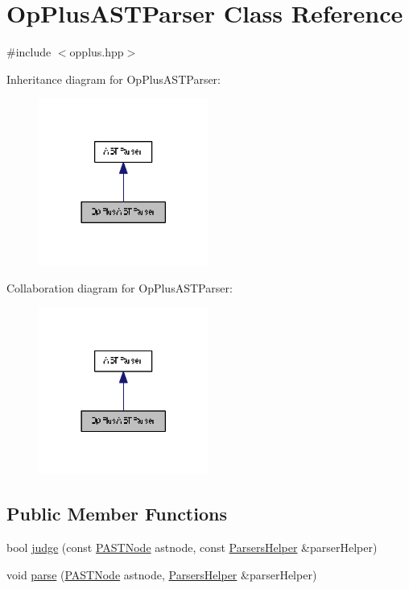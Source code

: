 \hypertarget{class_op_plus_a_s_t_parser}{}\section{Op\+Plus\+A\+S\+T\+Parser Class Reference}
\label{class_op_plus_a_s_t_parser}


{\ttfamily \#include $<$opplus.\+hpp$>$}



Inheritance diagram for Op\+Plus\+A\+S\+T\+Parser\+:
\nopagebreak
\begin{figure}[H]
\begin{center}
\leavevmode
\includegraphics[width=158pt]{class_op_plus_a_s_t_parser__inherit__graph}
\end{center}
\end{figure}


Collaboration diagram for Op\+Plus\+A\+S\+T\+Parser\+:
\nopagebreak
\begin{figure}[H]
\begin{center}
\leavevmode
\includegraphics[width=158pt]{class_op_plus_a_s_t_parser__coll__graph}
\end{center}
\end{figure}
\subsection*{Public Member Functions}
\begin{DoxyCompactItemize}
\item 
bool \hyperlink{class_op_plus_a_s_t_parser_a5d5c94b9e513353fbeabe040aa6b4d2e}{judge} (const \hyperlink{ast_8hpp_ab65291a3ef1ea9ec8e3d396783b77e46}{P\+A\+S\+T\+Node} astnode, const \hyperlink{class_parsers_helper}{Parsers\+Helper} \&parser\+Helper)
\item 
void \hyperlink{class_op_plus_a_s_t_parser_a0198d6f6c65f75cfc75b1f56c84bda6a}{parse} (\hyperlink{ast_8hpp_ab65291a3ef1ea9ec8e3d396783b77e46}{P\+A\+S\+T\+Node} astnode, \hyperlink{class_parsers_helper}{Parsers\+Helper} \&parser\+Helper)
\end{DoxyCompactItemize}


